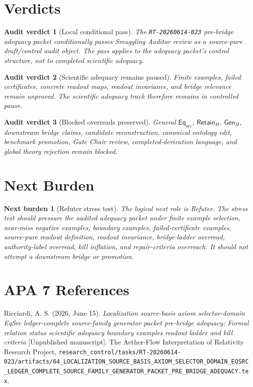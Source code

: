 \documentclass[11pt]{article}
\newcommand{\EqSrc}{\mathsf{Eq}_{\mathrm{src}}}
\newcommand{\RetainH}{\mathsf{Retain}_{H}}
\newcommand{\GenH}{\mathsf{Gen}_{H}}
\newtheorem{verdict}{Audit verdict}
\newtheorem{nextburden}{Next burden}
\begin{document}
\section{Verdicts}

\begin{verdict}[Local conditional pass]
The \texttt{RT-20260614-023} pre-bridge adequacy packet conditionally
passes Smuggling Auditor review as a source-pure draft/control audit
object. The pass applies to the adequacy packet's control structure, not
to completed scientific adequacy.
\end{verdict}

\begin{verdict}[Scientific adequacy remains paused]
Finite examples, failed certificates, concrete readout maps, readout
invariance, and bridge relevance remain unproved. The scientific
adequacy track therefore remains in controlled pause.
\end{verdict}

\begin{verdict}[Blocked overreads preserved]
General \(\EqSrc\), \(\RetainH\), \(\GenH\), downstream bridge claims,
candidate reconstruction, canonical ontology edit, benchmark promotion,
Gate Chair review, completed-derivation language, and global theory
rejection remain blocked.
\end{verdict}

\section{Next Burden}

\begin{nextburden}[Refuter stress test]
The logical next role is Refuter. The stress test should pressure the
audited adequacy packet under finite example selection, near-miss
negative examples, boundary examples, failed-certificate examples,
source-pure readout definition, readout invariance, bridge-ladder
overread, authority-label overread, kill inflation, and repair-criteria
overreach. It should not attempt a downstream bridge or promotion.
\end{nextburden}

\section*{APA 7 References}

Ricciardi, A. S. (2026, June 15). \emph{Localization source-basis axiom
selector-domain EqSrc ledger-complete source-family generator packet
pre-bridge adequacy: Formal relation status scientific adequacy boundary
examples readout ladder and kill criteria} [Unpublished manuscript]. The
Aether-Flow Interpretation of Relativity Research Project,
\texttt{research\_control/tasks/RT-20260614-023/artifacts/64\_LOCALIZATION\_SOURCE\_BASIS\_AXIOM\_SELECTOR\_DOMAIN\_EQSRC\_LEDGER\_COMPLETE\_SOURCE\_FAMILY\_GENERATOR\_PACKET\_PRE\_BRIDGE\_ADEQUACY.tex}.
\end{document}
